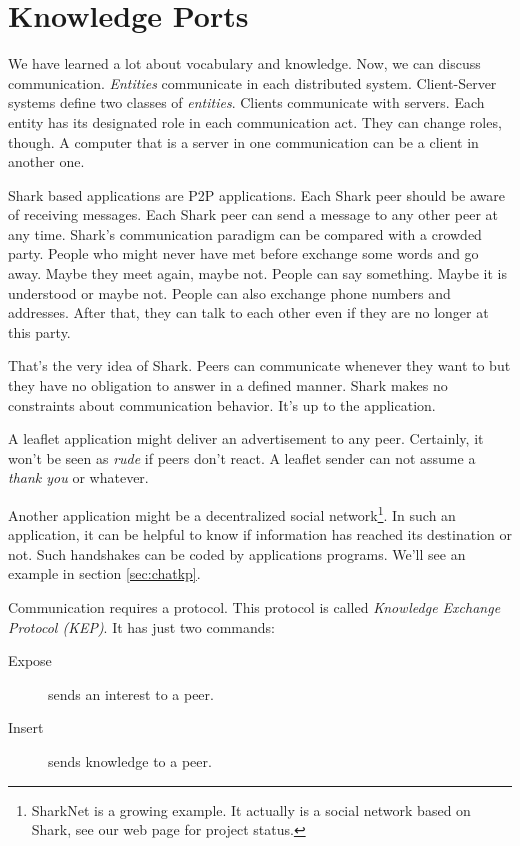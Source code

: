 \chapter{Knowledge Ports}
\label{sec:knowledgePorts}
We have learned a lot about vocabulary and knowledge. Now, we can discuss communication. {\it Entities} communicate in each distributed system. Client-Server systems define two classes of {\it entities}. Clients communicate with servers. Each entity has its designated role in each communication act. They can change roles, though. A computer that is a server in one communication can be a client in another one.

Shark based applications are P2P applications. Each Shark peer should be aware of receiving messages. Each Shark peer can send a message to any other peer at any time. Shark's communication paradigm can be compared with a crowded party. People who might never have met before exchange some words and go away. Maybe they meet again, maybe not. People can say something. Maybe it is understood or maybe not.
People can also exchange phone numbers and addresses. After that, they can talk to each other even if they are no longer at this party. 

That's the very idea of Shark. Peers can communicate whenever they want to but they have no obligation to answer in a defined manner. Shark makes no constraints about communication behavior. It's up to the application.

A leaflet application might deliver an advertisement to any peer. Certainly, it won't be seen as {\it rude} if peers don't react. A leaflet sender can not assume a {\it thank you} or whatever.

Another application might be a decentralized social network\footnote{SharkNet is
a growing example. It actually is a social network based on Shark, see our web page for project status.}. In such an application, it can be helpful to know if information has reached its destination or not. Such handshakes can be coded by applications programs. We'll see an example in section \ref{sec:chatkp}.

Communication requires a protocol. This protocol is called {\it Knowledge Exchange Protocol (KEP)}. It has just two commands: 

\begin{description}
    \item[Expose] sends an interest to a peer.
    \item[Insert] sends knowledge to a peer.
\end{description}

